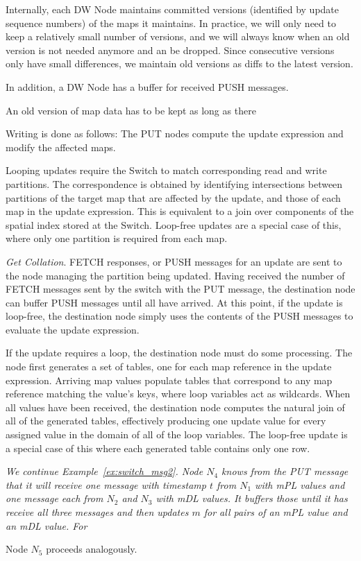 Internally, each DW Node maintains committed versions (identified
by update sequence numbers) of the maps it maintains. In practice, we
will only need to keep a relatively small number of versions, and we will always know when an old version is not needed anymore and an be dropped.
Since consecutive versions only have small differences, we maintain
old versions as diffs to the latest version.

\begin{todo}
In addition, a DW Node has a buffer for received PUSH messages. 

An old version of map data has to be kept as long as there


Writing is done as follows:
The PUT nodes compute the update expression and modify the affected maps.  

Looping updates require the Switch to match corresponding read and write partitions.  The correspondence is obtained by identifying intersections between partitions of the target map that are affected by the update, and those of each map in the update expression.  This is equivalent to a join over components of the spatial index stored at the Switch.  Loop-free updates are a special case of this, where only one partition is required from each map.


{\em Get Collation}.
FETCH responses, or PUSH messages for an update are sent to the node managing the partition being updated.  Having received the number of FETCH messages sent by the switch with the PUT message, the destination node can buffer PUSH messages until all have arrived.  At this point, if the update is loop-free, the destination node simply uses the contents of the PUSH messages to evaluate the update expression.

If the update requires a loop, the destination node must do some processing.  The node first generates a set of tables, one for each map reference in the update expression.  Arriving map values populate tables that correspond to any map reference matching the value's keys, where loop variables act as wildcards.  When all values have been received, the destination node computes the natural join of all of the generated tables, effectively producing one update value for every assigned value in the domain of all of the loop variables.  The loop-free update is a special case of this where each generated table contains only one row.
\end{todo}


\begin{example}\em
\label{ex:switch_msg3}
We continue Example~\ref{ex:switch_msg2}.
Node $N_4$ knows from the PUT message that it will receive
one message with timestamp $t$ from $N_1$ with mPL values and one message each
from $N_2$ and $N_3$ with mDL values. It buffers those until it has receive
all three messages and then updates $m$ for all pairs of an mPL value and an
mDL value.
For

Node $N_5$ proceeds analogously.
\punto
\end{example}


